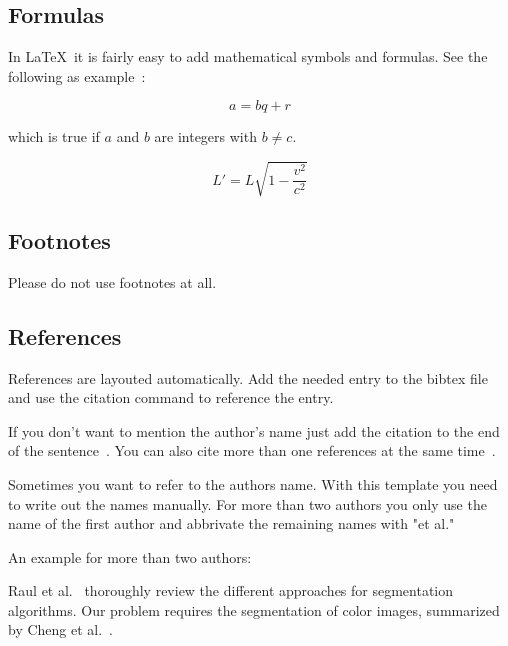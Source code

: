 \subsection{Formulas}

In \LaTeX~it is fairly easy to add mathematical symbols and formulas. See the following as example~\cite{wiki_2019_mat}:

\begin{equation} \label{eq:erl}
    a = bq + r
\end{equation}
    
which is true if $a$ and $b$ are integers with $b \neq c$.

\begin{equation}
    L' = {L}{\sqrt{1-\frac{v^2}{c^2}}}
\end{equation}


\subsection{Footnotes}

Please do not use footnotes at all.


\subsection{References}

References are layouted automatically. Add the needed entry to the bibtex file and use the citation command to reference the entry.

If you don't want to mention the author's name just add the citation to the end of the sentence~\cite{perlin_1985_ais}. You can also cite more than one references at the same time~\cite{gebhardt_2018_ofa, perlin_1985_ais, semmo_2015_iso}.

Sometimes you want to refer to the authors name. With this template you need to write out the names manually. For more than two authors you only use the name of the first author and abbrivate the remaining names with "et al." 

An example for more than two authors: 

Raul et al.~\cite{raut_2009_isa} thoroughly review the different approaches for segmentation algorithms. Our problem requires the segmentation of color images, summarized by Cheng et al.~\cite{cheng_2001_cis}.

